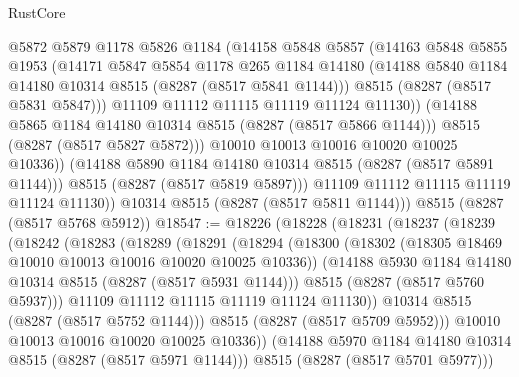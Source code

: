 \begin{lexlean}{RustCore}
\begin{coremodule}
                  @5872
                  @5879
                  @1178
                  @5826
                  @1184
                  (@14158
                    @5848
                    @5857
                    (@14163
                      @5848
                      @5855
                      @1953
                      (@14171
                        @5847
                        @5854
                        @1178
                        @265
                        @1184
                        @14180
                        (@14188 @5840 @1184 @14180 @10314 @8515 (@8287 (@8517 @5841 @1144)))
                        @8515
                        (@8287 (@8517 @5831 @5847)))
                      @11109
                      @11112
                      @11115
                      @11119
                      @11124
                      @11130))
                  (@14188 @5865 @1184 @14180 @10314 @8515 (@8287 (@8517 @5866 @1144)))
                  @8515
                  (@8287 (@8517 @5827 @5872)))
                @10010
                @10013
                @10016
                @10020
                @10025
                @10336))
            (@14188 @5890 @1184 @14180 @10314 @8515 (@8287 (@8517 @5891 @1144)))
            @8515
            (@8287 (@8517 @5819 @5897)))
          @11109
          @11112
          @11115
          @11119
          @11124
          @11130))
      @10314
      @8515
      (@8287 (@8517 @5811 @1144)))
    @8515
    (@8287 (@8517 @5768 @5912))
@18547 := @18226
    (@18228
      (@18231
        (@18237
          (@18239
            (@18242
              (@18283
                (@18289
                  (@18291
                    (@18294
                      (@18300
                        (@18302 (@18305 @18469 @10010 @10013 @10016 @10020 @10025 @10336))
                        (@14188 @5930 @1184 @14180 @10314 @8515 (@8287 (@8517 @5931 @1144)))
                        @8515
                        (@8287 (@8517 @5760 @5937)))
                      @11109
                      @11112
                      @11115
                      @11119
                      @11124
                      @11130))
                  @10314
                  @8515
                  (@8287 (@8517 @5752 @1144)))
                @8515
                (@8287 (@8517 @5709 @5952)))
              @10010
              @10013
              @10016
              @10020
              @10025
              @10336))
          (@14188 @5970 @1184 @14180 @10314 @8515 (@8287 (@8517 @5971 @1144)))
          @8515
          (@8287 (@8517 @5701 @5977)))

\end{coremodule}
\end{lexlean}
